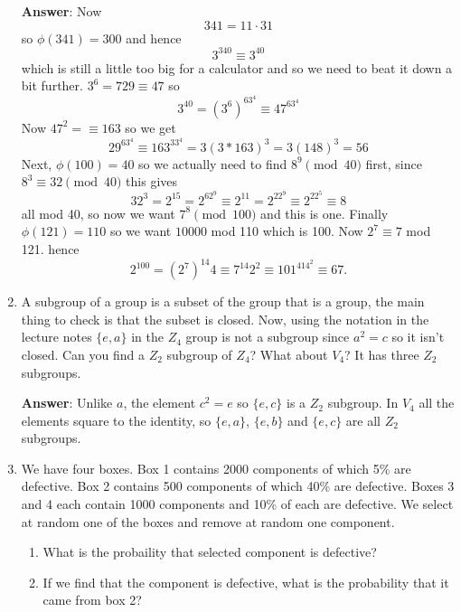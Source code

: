\documentclass[12pt]{article}
\begin{document}
\begin{enumerate}
\textbf{Answer}: 
Now
\begin{equation}
341=11\cdot 31
\end{equation}
so $\phi(341)=300$ and hence
\begin{equation}
3^{340}\equiv 3^{40}
\end{equation}
which is still a little too big for a calculator and so we need to
beat it down a bit further. $3^6=729\equiv 47$ so
\begin{equation}
3^{40}=(3^6)^63^4\equiv 47^63^4
\end{equation}
Now $47^2=\equiv 163$ so we get
\begin{equation}
29^63^4\equiv 163^33^4 = 3(3*163)^3=3(148)^3=56
\end{equation}
Next, $\phi(100)=40$ so we actually need to find $8^9\pmod{40}$ first, since $8^3\equiv 32\pmod{40}$ this gives 
\begin{equation}
32^3=2^{15}= 2^62^9\equiv 2^{11}=2^22^9\equiv 2^22^5\equiv 8
\end{equation}
all mod 40, so now we want $7^8\pmod{100}$ and this is one. Finally $\phi(121)=110$ so we want $10000$ mod 110 which is 100. Now $2^7\equiv 7$ mod 121. hence
\begin{equation}
2^{100}=(2^7)^{14}4\equiv 7^{14}2^2\equiv 101^414^2\equiv 67.
\end{equation}

\item A subgroup of a group is a subset of the group that is a group,
  the main thing to check is that the subset is closed. Now, using the
  notation in the lecture notes $\{e,a\}$ in the $Z_4$ group is not a
  subgroup since $a^2=c$ so it isn't closed. Can you find a $Z_2$
  subgroup of $Z_4$? What about $V_4$? It has three $Z_2$ subgroups.

\textbf{Answer}:
Unlike $a$, the element $c^2=e$ so $\{e,c\}$ is a $Z_2$ subgroup. In $V_4$ all the elements square to the identity, so $\{e,a\}$, $\{e,b\}$ and $\{e,c\}$ are all $Z_2$ subgroups.


\item
We have four boxes. Box 1 contains 2000 components of which 5\% are defective. Box 2 contains 500 components of which 40\% are defective. Boxes 3 and 4 each contain 1000 components and 10\% of each are defective. We select at random one of the boxes and remove at random one component. 
\begin{enumerate}
\item What is the probaility that selected component is defective?
\item If we find that the component is defective, what is the probability that it came from box 2?
\end{enumerate}


\end{enumerate}
\end{document}
